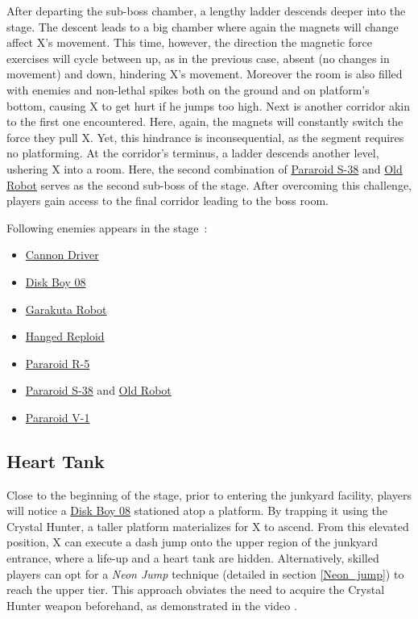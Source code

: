 After departing the sub-boss chamber, a lengthy ladder descends deeper into the stage. The descent leads to a big chamber where again the magnets will change affect X's movement. This time, however, the direction the magnetic force exercises will cycle between up, as in the previous case, absent (no changes in movement) and down, hindering X's movement. Moreover the room is also filled with enemies and non-lethal spikes both on the ground and on platform's bottom, causing X to get hurt if he jumps too high. Next is another corridor akin to the first one encountered. Here, again, the magnets will constantly switch the force they pull X. Yet, this hindrance is inconsequential, as the segment requires no platforming. At the corridor's terminus, a ladder descends another level, ushering X into a room. Here, the second combination of \hyperlink{miniboss:Pararoid_S-38}{Pararoid S-38} and \hyperlink{miniboss:Old_robot}{Old Robot} serves as the second sub-boss of the stage. After overcoming this challenge, players gain access to the final corridor leading to the boss room.

Following enemies appears in the stage~\cite{wiki:Robot_Junkyard}:
\begin{itemize}
	
	\item \hyperlink {enem:Cannon_Driver}{Cannon Driver}
	\item \hyperlink {enem:Disk_Boy_08}{Disk Boy 08}
	\item \hyperlink {enem:Garakuta_Robot}{Garakuta Robot} 
	\item \hyperlink {enem:Hanged_Reploid}{Hanged Reploid}
	\item \hyperlink {enem:Pararoid_R-5}{Pararoid R-5}
	\item \hyperlink {miniboss:Pararoid_S-38}{Pararoid S-38} and \hyperlink{miniboss:Old_robot}{Old Robot}
	\item \hyperlink {enem:Pararoid_V-1}{Pararoid V-1}
\end{itemize}


\subsection{Heart Tank}
Close to the beginning of the stage, prior to entering the junkyard facility, players will notice a \hyperlink {enem:Disk_Boy_08}{Disk Boy 08} stationed atop a platform. By trapping it using the Crystal Hunter, a taller platform materializes for X to ascend. From this elevated position, X can execute a dash jump onto the upper region of the junkyard entrance, where a life-up and a heart tank are hidden. Alternatively, skilled players can opt for a \emph{Neon Jump} technique (detailed in section \ref{Neon_jump}) to reach the upper tier. This approach obviates the need to acquire the Crystal Hunter weapon beforehand, as demonstrated in the video .

